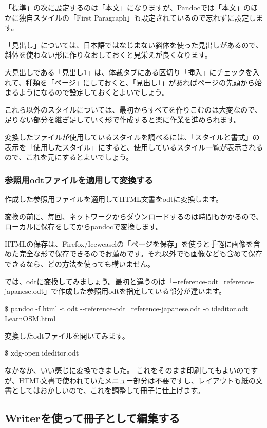 \documentclass[]{article}
\begin{document}
「標準」の次に設定するのは「本文」になりますが、Pandocでは「本文」のほかに独自スタイルの「First
Paragraph」も設定されているので忘れずに設定します。

「見出し」については、日本語ではなじまない斜体を使った見出しがあるので、斜体を使わない形に作りなおしておくと見栄えが良くなります。

大見出しである「見出し1」は、体裁タブにある区切り「挿入」にチェックを入れて、種類を「ページ」にしておくと、「見出し1」があればページの先頭から始まるようになるので設定しておくとよいでしょう。

これら以外のスタイルについては、最初からすべてを作りこむのは大変なので、足りない部分を継ぎ足していく形で作成すると楽に作業を進められます。

変換したファイルが使用しているスタイルを調べるには、「スタイルと書式」の表示を「使用したスタイル」にすると、使用しているスタイル一覧が表示されるので、これを元にするとよいでしょう。

\subsubsection{参照用odtファイルを適用して変換する}\label{ux53c2ux7167ux7528odtux30d5ux30a1ux30a4ux30ebux3092ux9069ux7528ux3057ux3066ux5909ux63dbux3059ux308b}

作成した参照用ファイルを適用してHTML文書をodtに変換します。

変換の前に、毎回、ネットワークからダウンロードするのは時間もかかるので、ローカルに保存をしてからpandocで変換します。

HTMLの保存は、Firefox/Iceweaselの「ページを保存」を使うと手軽に画像を含めた完全な形で保存できるのでお薦めです。それ以外でも画像なども含めて保存できるなら、どの方法を使っても構いません。

では、odtに変換してみましょう。最初と違うのは「-\/-reference-odt=reference-japanese.odt」で作成した参照用odtを指定している部分が違います。

\$ pandoc -f html -t odt -\/-reference-odt=reference-japanese.odt -o
ideditor.odt LearnOSM.html

変換したodtファイルを開いてみます。

\$ xdg-open ideditor.odt

なかなか、いい感じに変換できました。
これをそのまま印刷してもよいのですが、HTML文書で使われていたメニュー部分は不要ですし、レイアウトも紙の文書としてはおかしいので、これを調整して冊子に仕上げます。

\subsection{Writerを使って冊子として編集する}\label{writerux3092ux4f7fux3063ux3066ux518aux5b50ux3068ux3057ux3066ux7de8ux96c6ux3059ux308b}
\end{document}
